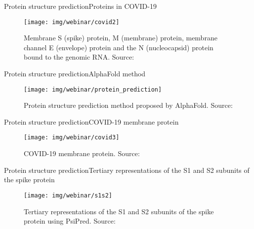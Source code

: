 \documentclass[10pt]{beamer}
\newcommand{\1}{
        	\setbeamertemplate{background}{
        		\texttt{[image: img/1]}
        		\tikz[overlay] \fill[fill opacity=0.75,fill=white] (0,0) rectangle (-\paperwidth,\paperheight);
        	}
}
\begin{document}
\begin{frame}{Protein structure prediction}{Proteins in COVID-19}
	\begin{figure}[]
		\centering
		\texttt{[image: img/webinar/covid2]}
		\label{img:mot2}
		\caption{Membrane S (spike) protein, M (membrane) protein, membrane channel E (envelope) protein and the N (nucleocapsid) protein bound to the genomic RNA. Source: \cite{Goodsell2020}}
	\end{figure}
\end{frame}


\begin{frame}{Protein structure prediction}{AlphaFold method}
	\begin{figure}[]
		\centering
		\texttt{[image: img/webinar/protein\_prediction]}
		\label{img:mot2}
		\caption{Protein structure prediction method proposed by AlphaFold. Source: \cite{alphafold2020}}
	\end{figure}
\end{frame}

\begin{frame}{Protein structure prediction}{COVID-19 membrane protein}
	\begin{figure}[]
		\centering
		\texttt{[image: img/webinar/covid3]}
		\label{img:mot2}
		\caption{COVID-19 membrane protein. Source: \cite{alphafold2020}}
	\end{figure}
\end{frame}


\begin{frame}{Protein structure prediction}{Tertiary representations of the S1 and S2 subunits of the spike protein}
	\begin{figure}[]
		\centering
		\texttt{[image: img/webinar/s1s2]}
		\label{img:mot2}
		\caption{Tertiary representations of the S1 and S2 subunits of the spike protein using PsiPred. Source: \cite{spiga2003molecular}}
	\end{figure}
\end{frame}
\end{document}
